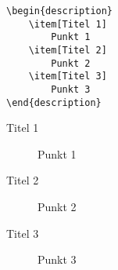 \begin{frame}[fragile]
	\Code
	\begin{lstlisting}
\begin{description}
	\item[Titel 1]
		Punkt 1
	\item[Titel 2]
		Punkt 2
	\item[Titel 3]
		Punkt 3
\end{description}
	\end{lstlisting}
	
	\Ausgabe
	\begin{outputbox}
		\begin{description}
			\item[Titel 1]
				Punkt 1
			\item[Titel 2]
				Punkt 2
			\item[Titel 3]
				Punkt 3
		\end{description}
	\end{outputbox}
\end{frame}
